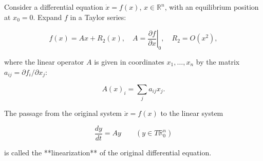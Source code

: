 Consider a differential equation $\dot{x} = f(x)$, $x \in \mathbb{R}^n$, with an equilibrium position at $x_0 = 0$. Expand $f$ in a Taylor series:

$$f(x) = Ax + R_2(x), \quad A = \left. \frac{\partial f}{\partial x} \right|_0, \quad R_2 = O(x^2),$$

where the linear operator $A$ is given in coordinates $x_1, \ldots, x_n$ by the matrix $a_{ij} = \partial f_i / \partial x_j$:

$$A(x)_i = \sum_j a_{ij} x_j.$$

The passage from the original system $\dot{x} = f(x)$ to the linear system

$$\frac{dy}{dt} = A y \qquad (y \in T\mathbb{R}^n_0)$$

is called the **linearization** of the original differential equation.
